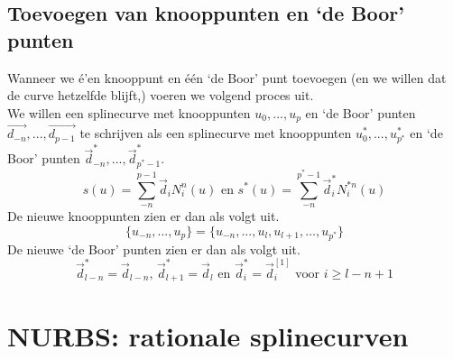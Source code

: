 \documentclass[computergesteund_ontwerp_van_curven_en_oppervlakken.tex]{subfiles}
\begin{document}
\subsection{Toevoegen van knooppunten en `de Boor' punten}
Wanneer we \'e'en knooppunt en \'e\'en `de Boor' punt toevoegen (en we willen dat de curve hetzelfde blijft,) voeren we volgend proces uit.\\
We willen een splinecurve met knooppunten $u_0,...,u_p$ en `de Boor' punten $\vec{d_{-n}},...,\vec{d_{p-1}}$ te schrijven als een splinecurve met knooppunten $u^{*}_0,...,u^{*}_{p^{*}}$ en `de Boor' punten $\vec{d}_{-n}^{*},...,\vec{d}_{p^{*}-1}^{*}$.
\[
s(u) = \sum_{-n}^{p-1}\vec{d}_iN_{i}^{n}(u) \text{ en } s^{*}(u) = \sum_{-n}^{p^{*}-1}\vec{d}^{*}_iN_{i}^{*n}(u) 
\]
De nieuwe knooppunten zien er dan als volgt uit.
\[
\{u_{-n},...,u_{p}\}
= \{u_{-n},...,u_{l},u_{l+1},...,u_{p^{*}}\} 
\]
De nieuwe `de Boor' punten zien er dan als volgt uit.
\[
\vec{d}_{l-n}^{*} = \vec{d}_{l-n} \text{, } \vec{d}_{l+1}^{*} = \vec{d}_{l}\text{ en } \vec{d}_{i}^{*} = \vec{d}_{i}^{[1]} \text{ voor } i\ge l-n+1
\]

\section{NURBS: rationale splinecurven}
\end{document}
